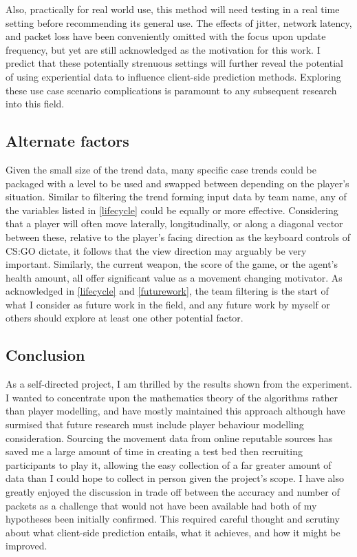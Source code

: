 \documentclass[journal]{IEEEtran}
\begin{document}
Also, practically for real world use, this method will need testing in a real time setting before recommending its general use. The effects of jitter, network latency, and packet loss have been conveniently omitted with the focus upon update frequency, but yet are still acknowledged as the motivation for this work. I predict that these potentially strenuous settings will further reveal the potential of using experiential data to influence client-side prediction methods. Exploring these use case scenario complications is paramount to any subsequent research into this field.

\subsection{Alternate factors} \label{app:factors}

Given the small size of the trend data, many specific case trends could be packaged with a level to be used and swapped between depending on the player's situation. Similar to filtering the trend forming input data by team name, any of the variables listed in \ref{lifecycle} could be equally or more effective. Considering that a player will often move laterally, longitudinally, or along a diagonal vector between these, relative to the player's facing direction as the keyboard controls of CS:GO dictate, it follows that the view direction may arguably be very important. Similarly, the current weapon, the score of the game, or the agent's health amount, all offer significant value as a movement changing motivator. As acknowledged in \ref{lifecycle} and \ref{futurework}, the team filtering is the start of what I consider as future work in the field, and any future work by myself or others should explore at least one other potential factor.

\subsection{Conclusion}

As a self-directed project, I am thrilled by the results shown from the experiment. I wanted to concentrate upon the mathematics theory of the algorithms rather than player modelling, and have mostly maintained this approach although have surmised that future research must include player behaviour modelling consideration. Sourcing the movement data from online reputable sources has saved me a large amount of time in creating a test bed then recruiting participants to play it, allowing the easy collection of a far greater amount of data than I could hope to collect in person given the project's scope. I have also greatly enjoyed the discussion in trade off between the accuracy and number of packets as a challenge that would not have been available had both of my hypotheses been initially confirmed. This required careful thought and scrutiny about what client-side prediction entails, what it achieves, and how it might be improved.
\end{document}
